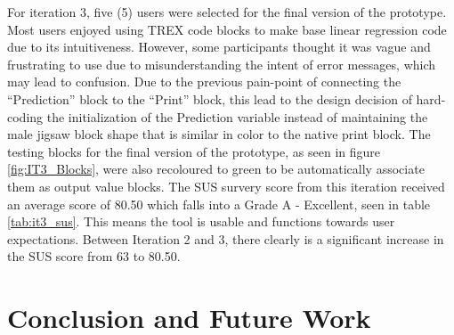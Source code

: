 \documentclass{sigchi-ext}
\begin{document}
For iteration 3,
five (5) users were selected for the final version of the prototype.
Most users enjoyed using TREX code blocks to make base linear regression code due to its intuitiveness. However, some participants thought it was vague and frustrating to use due to misunderstanding the intent of error messages, which may lead to confusion. Due to the previous pain-point of connecting the ``Prediction'' block to the ``Print'' block, this lead to the design decision of hard-coding the initialization of the Prediction variable instead of maintaining the male jigsaw block shape that is similar in color to the native print block. The testing blocks for the final version of the prototype, as seen in figure \ref{fig:IT3_Blocks}, were also recoloured to green to be automatically associate them as output value blocks. The SUS survery score from this iteration received an average score of 80.50 which falls into a Grade A - Excellent, seen in table \ref{tab:it3_sus}. This means the tool is usable and functions towards user expectations. Between Iteration 2 and 3, there clearly is a significant increase in the SUS score from 63 to 80.50.



\section{Conclusion and Future Work}
\end{document}
